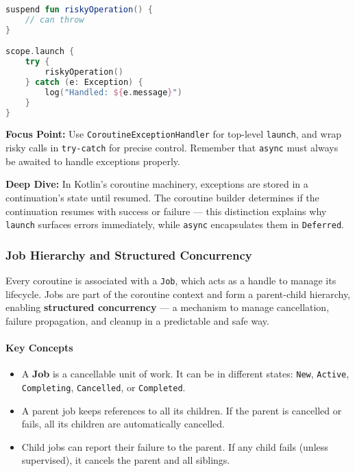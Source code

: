 \documentclass[a4paper,12pt]{article}
\begin{document}
\begin{lstlisting}[language=Kotlin]
suspend fun riskyOperation() {
    // can throw
}

scope.launch {
    try {
        riskyOperation()
    } catch (e: Exception) {
        log("Handled: ${e.message}")
    }
}
\end{lstlisting}

\textbf{Focus Point:} Use \texttt{CoroutineExceptionHandler} for top-level \texttt{launch}, and wrap risky calls in \texttt{try-catch} for precise control. Remember that \texttt{async} must always be awaited to handle exceptions properly.

\textbf{Deep Dive:}  
In Kotlin's coroutine machinery, exceptions are stored in a continuation's state until resumed. The coroutine builder determines if the continuation resumes with success or failure — this distinction explains why \texttt{launch} surfaces errors immediately, while \texttt{async} encapsulates them in \texttt{Deferred}.

\subsubsection{Job Hierarchy and Structured Concurrency}

Every coroutine is associated with a \texttt{Job}, which acts as a handle to manage its lifecycle. Jobs are part of the coroutine context and form a parent-child hierarchy, enabling \textbf{structured concurrency} — a mechanism to manage cancellation, failure propagation, and cleanup in a predictable and safe way.

\paragraph{Key Concepts}

\begin{itemize}
  \item A \textbf{Job} is a cancellable unit of work. It can be in different states: \texttt{New}, \texttt{Active}, \texttt{Completing}, \texttt{Cancelled}, or \texttt{Completed}.
  \item A parent job keeps references to all its children. If the parent is cancelled or fails, all its children are automatically cancelled.
  \item Child jobs can report their failure to the parent. If any child fails (unless supervised), it cancels the parent and all siblings.
\end{itemize}
\end{document}
